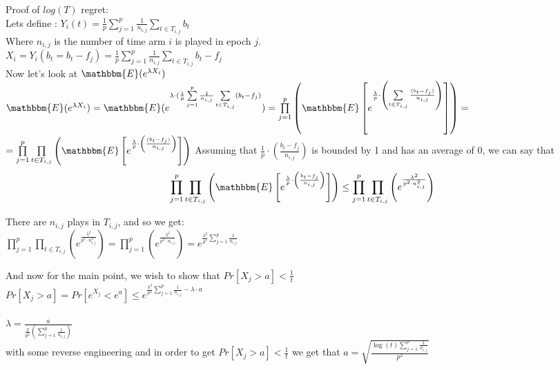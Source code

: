 \documentclass{llncs}
\begin{document}
		Proof of $log(T)$ regret:
		\\
		Lets define : $Y_i(t) = \frac{1}{p}\sum\limits_{j=1}^{p}\frac{1}{n_{i,j}}
						   \sum\limits_{t\in T_{i,j}} b_t$		
		\\
		Where $n_{i,j}$ is the number of time arm $i$ is played in epoch $j$.\\
		$X_i = Y_i (b_t = b_t- f_j) =   \frac{1}{p}\sum\limits_{j=1}^{p}\frac{1}{n_{i,j}}
						   \sum\limits_{t\in T_{i,j}} b_t-f_j$	
		\\
		Now let's look at $\mathbbm{E}(e^{\lambda X_i})$
		\\	
		$\mathbbm{E}(e^{\lambda X_i}) = \mathbbm{E}(e^{\lambda\cdot(
		\frac{1}{p}\sum\limits_{j=1}^{p}\frac{1}{n_{i,j}}
						   \sum\limits_{t\in T_{i,j}}( b_t-f_j
						   )}) =						      	   
						   \prod\limits_{j=1}^{p}
						   \left(
						   \mathbbm{E}\left[e^{\frac{\lambda}{p}\cdot\left(
						   	   \sum\limits_{t\in T_{i,j}}
						   	   		\frac{(b_t-f_j)}{n_{i,j}}
						\right)}\right]
						   \right)=
						   $		
						   \\
						   $ =						      	   
						   \prod\limits_{j=1}^{p}
						   \prod\limits_{t\in T_{i,j}}
						   \left(
						   \mathbbm{E}\left[e^{\frac{\lambda}
						   {p}\cdot\left(
						   	   		\frac{(b_t-f_j)}
						   	   		{n_{i,j}}\right)}
						   	   		\right]
						   \right)$
		Assuming that $\frac{1}{p}\cdot\left(\frac{b_t-f_j}
		{n_{i,j}}\right) $ is bounded by 1 and has an average of 0, we can say that
		\\
		$$ \prod\limits_{j=1}^{p}
						   \prod\limits_{t\in T_{i,j}}
						   \left(
						   \mathbbm{E}\left[e^{\frac{\lambda}
						   {p}\cdot\left(
						   	   		\frac{b_t-f_j}
						   	   		{n_{i,j}}\right)}
						   	   		\right]
						   \right) \leq
						   \prod\limits_{j=1}^{p}
						   \prod\limits_{t\in T_{i,j}}
						   \left(
						   e^{\frac{\lambda^2}{p^2\cdot n^2_{i,j}}}
						   \right)
						   $$
						   
						  There are $n_{i,j}$ plays in $T_{i,j}$, and so we get:
						  \\
						  $\prod\limits_{j=1}^{p}
						   \prod\limits_{t\in T_{i,j}}
						   \left(
						   e^{\frac{\lambda^2}{p^2\cdot n^2_{i,j}}}
						   \right) = 
						   \prod\limits_{j=1}^{p}						   
						   \left(
						   e^{\frac{\lambda^2}{p^2\cdot n_{i,j}}}
						   \right) = 
						   e^{
						   \frac{\lambda^2}{p^2}
						   \sum\limits_{j=1}^{p} \frac{1}{n_{i,j}}
						   }$
						
		And now for the main point, we wish to show that 
		$Pr[X_j > a] < \frac{1}{t}$\\
		$Pr[X_j > a] = Pr[e^{X_j} < e^a] \leq e^{
						   \frac{\lambda^2}{p^2}
						   \sum\limits_{j=1}^{p} \frac{1}{n_{i,j}}
						   - \lambda\cdot a}$
		\\
		\\
		$\lambda = \frac{a}{\frac{2}{p^2}\left( \sum\limits_{j=1}^{p} \frac{1}{n_{i,j}} \right)} $ 
		\\
		with some reverse engineering and in order to get $Pr[X_j > a] < \frac{1}{t}$ we get that $a = \sqrt{\frac{\log(t) \sum\limits_{j=1}^{p} \frac{1}{n_{i,j}}}{p^2}}$ 
 
\end{document}
